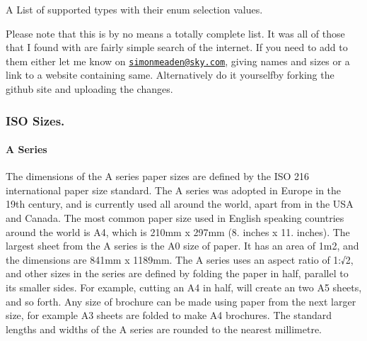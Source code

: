 A List of supported types with their enum selection values.

Please note that this is by no means a totally complete list. It was all of those that I found with are fairly simple search of the internet. If you need to add to them either let me know on \href{mailto:simonmeaden@sky.com}{\tt simonmeaden@sky.\+com}, giving names and sizes or a link to a website containing same. Alternatively do it yourselfby forking the github site and uploading the changes.

\subsubsection*{I\+SO Sizes.}

\paragraph*{A Series}

The dimensions of the A series paper sizes are defined by the I\+SO 216 international paper size standard. The A series was adopted in Europe in the 19th century, and is currently used all around the world, apart from in the U\+SA and Canada. The most common paper size used in English speaking countries around the world is A4, which is 210mm x 297mm (8. inches x 11. inches). The largest sheet from the A series is the A0 size of paper. It has an area of 1m2, and the dimensions are 841mm x 1189mm. The A series uses an aspect ratio of 1\+:√2, and other sizes in the series are defined by folding the paper in half, parallel to its smaller sides. For example, cutting an A4 in half, will create an two A5 sheets, and so forth. Any size of brochure can be made using paper from the next larger size, for example A3 sheets are folded to make A4 brochures. The standard lengths and widths of the A series are rounded to the nearest millimetre.

